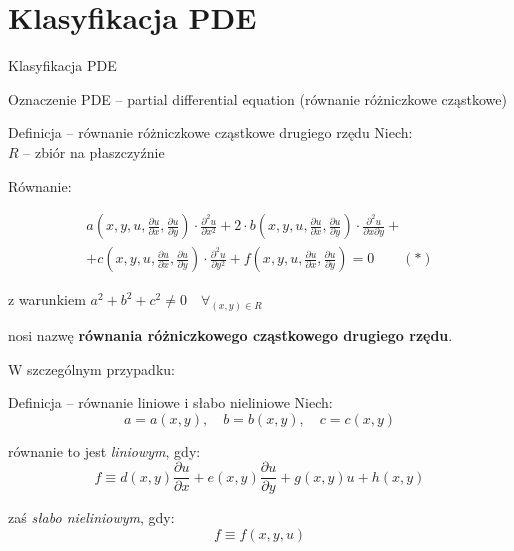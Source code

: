 \section{Klasyfikacja PDE}

\begin{frame}{Klasyfikacja PDE}
  \begin{block}{Oznaczenie}
    PDE -- partial differential equation (równanie różniczkowe cząstkowe)
  \end{block}
\end{frame}

\begin{frame}
  \begin{block}{Definicja -- równanie różniczkowe cząstkowe drugiego rzędu}
    Niech:\\
    $R$ -- zbiór na płaszczyźnie

    Równanie:

    \begin{multline*}
      a(x, y, u, \frac{{\partial}u}{{\partial}x}, \frac{{\partial}u}{{\partial}y}) \cdot \frac{{\partial}^2u}{{\partial}x^2} +
      2 \cdot b(x, y, u, \frac{{\partial}u}{{\partial}x}, \frac{{\partial}u}{{\partial}y}) \cdot \frac{{\partial}^2u}{{\partial}x{\partial}y} + \\
      + c(x, y, u, \frac{{\partial}u}{{\partial}x}, \frac{{\partial}u}{{\partial}y}) \cdot \frac{{\partial}^2u}{{\partial}y^2} +
      f(x, y, u, \frac{{\partial}u}{{\partial}x}, \frac{{\partial}u}{{\partial}y}) = 0 \qquad (*)
    \end{multline*}

    z warunkiem $a^2 + b^2 + c^2 \not = 0 \quad \forall_{(x,y) \in R}$

    nosi nazwę \textbf{równania różniczkowego cząstkowego drugiego rzędu}.
  \end{block}
\end{frame}

\begin{frame}
  W szczególnym przypadku:

  \begin{block}{Definicja -- równanie liniowe i słabo nieliniowe}
    Niech:
    $$a = a(x,y), \quad b = b(x,y), \quad c = c(x,y)$$

    równanie to jest \textit{liniowym}, gdy:
    $$f \equiv d(x,y) \frac{{\partial}u}{{\partial}x} + e(x,y) \frac{{\partial}u}{{\partial}y} + g(x,y)u + h(x,y)$$

    zaś \textit{słabo nieliniowym}, gdy:
    $$f \equiv f(x,y,u)$$
  \end{block}
\end{frame}

